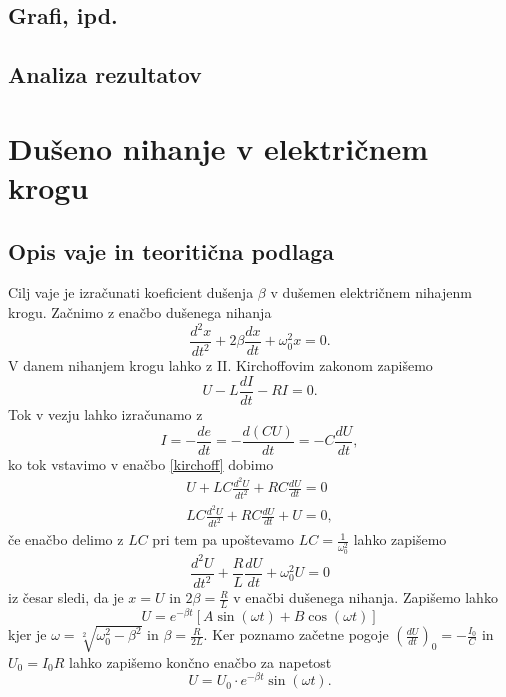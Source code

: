 \documentclass[12pt]{article}
\begin{document}
	\subsection*{Grafi, ipd.}
	\subsection*{Analiza rezultatov}

\newpage
\section{Dušeno nihanje v električnem krogu}
	\subsection*{Opis vaje in teoritična podlaga}
	Cilj vaje je izračunati koeficient dušenja $\beta$ v dušemen električnem nihajenm krogu.
	Začnimo z enačbo dušenega nihanja \cite{nihanje}
	\begin{equation}
		\frac{d^2 x}{dt^2} + 2\beta\frac{dx}{dt} + \omega_0^2 x =0 .
	\end{equation}
	V danem nihanjem krogu lahko z II. Kirchoffovim zakonom zapišemo
	\begin{equation}
		U - L\frac{dI}{dt} - RI = 0.
		\label{kirchoff}
	\end{equation}
	Tok v vezju lahko izračunamo z 
	\begin{equation}
		I = -\frac{de}{dt} = -\frac{d(CU)}{dt} = -C \frac{dU}{dt},
	\end{equation} ko tok vstavimo v enačbo \ref{kirchoff} dobimo
	\begin{equation}
		\begin{split}
			U + LC \frac{d^2U}{dt^2} + RC \frac{dU}{dt} = 0 \\
			LC \frac{d^2U}{dt^2} + RC \frac{dU}{dt} + U = 0,
		\end{split}
	\end{equation} če enačbo delimo z $LC$ pri tem pa upoštevamo $LC = \frac{1}{\omega_0^2}$ 
	lahko zapišemo
	\begin{equation}
		\frac{d^2U}{dt^2} + \frac{R}{L} \frac{dU}{dt} + \omega_0^2U = 0
	\end{equation} iz česar sledi, da je $x = U$ in $2\beta = \frac{R}{L}$ v enačbi dušenega
	nihanja. 
	Zapišemo lahko \cite{vaje}
	\begin{equation}
		U = e^{-\beta t}[A \sin(\omega t) + B \cos(\omega t)]
	\end{equation} kjer je $\omega = \sqrt[2]{\omega_0^2  - \beta^2}$ in $\beta = \frac{R}{2L}$.
	Ker poznamo začetne pogoje $(\frac{dU}{dt})_0 = - \frac{I_0}{C}$ in $U_0 = I_0 R$ lahko
	zapišemo končno enačbo za napetost
	\begin{equation}
		U = U_0 \cdot e^{-\beta t} \sin(\omega t).
	\end{equation}
\end{document}
